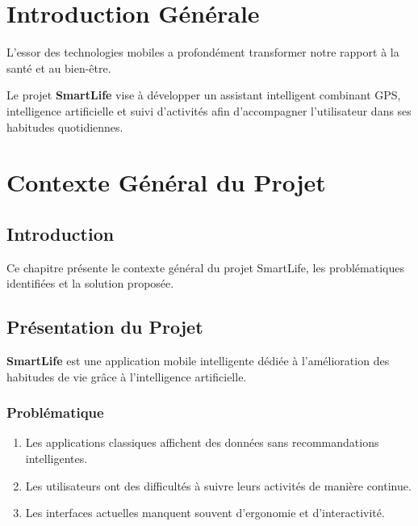 \documentclass[12pt,a4paper,oneside]{report}
\begin{document}
    \chapter*{Introduction Générale}

    L’essor des technologies mobiles a profondément transformer notre rapport à la santé et au bien-être.

    Le projet \textbf{SmartLife} vise à développer un assistant intelligent combinant GPS, intelligence artificielle et suivi d’activités afin d’accompagner l’utilisateur dans ses habitudes quotidiennes.

    \chapter{Contexte Général du Projet}

    \section{Introduction}

    Ce chapitre présente le contexte général du projet SmartLife, les problématiques identifiées et la solution proposée.

    \section{Présentation du Projet}

    \textbf{SmartLife} est une application mobile intelligente dédiée à l’amélioration des habitudes de vie grâce à l’intelligence artificielle.

    \subsection{Problématique}

    \begin{enumerate}

        \item Les applications classiques affichent des données sans recommandations intelligentes.

        \item Les utilisateurs ont des difficultés à suivre leurs activités de manière continue.

        \item Les interfaces actuelles manquent souvent d’ergonomie et d’interactivité.

    \end{enumerate}
\end{document}
